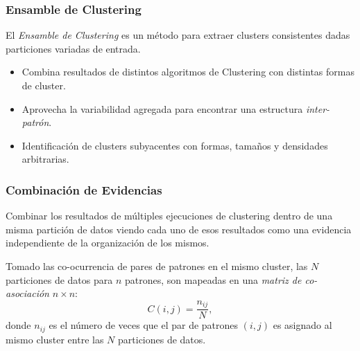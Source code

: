 \begin{frame}
	\frametitle{Ensamble de Clustering}
	\begin{tcolorbox}[colback=blue!5,colframe=blue!40!black,title=Ensamble de Clustering]
		El \textit{Ensamble de Clustering} es un método para extraer clusters consistentes dadas particiones variadas de entrada.
	\end{tcolorbox}

 	\bigskip

	\begin{itemize}
		\item Combina resultados de distintos algoritmos de Clustering con distintas formas de cluster.
		\item Aprovecha la variabilidad agregada para encontrar una estructura \textit{inter-patrón}.
		\item Identificación de clusters subyacentes con formas, tamaños y densidades arbitrarias.
	\end{itemize}
\end{frame}

\begin{frame}
	\frametitle{Combinación de Evidencias}
	Combinar los resultados de múltiples ejecuciones de clustering dentro de una misma partición de datos viendo cada uno de esos resultados como una evidencia independiente de la organización de los mismos.

	\bigskip

	Tomado las co-ocurrencia de pares de patrones en el mismo cluster, las \(N\) particiones de datos para \(n\) patrones, son mapeadas en una \textit{matriz de co-asociación} \(n \times n\):
	\[C(i,j)=\frac{n_{ij}}{N},\]
	donde \(n_{ij}\) es el número de veces que el par de patrones \((i,j)\) es asignado al mismo cluster entre las \(N\) particiones de datos.
\end{frame}
